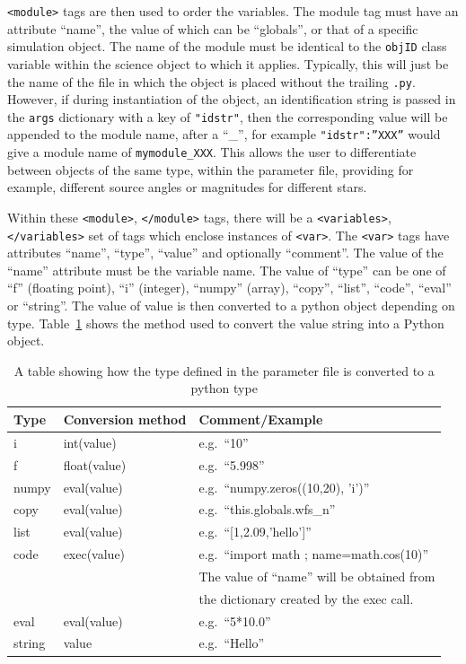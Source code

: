 \documentclass{article}
\begin{document}
\texttt{<module>} tags are then used to order the variables.  The
module tag must have an attribute ``name'', the value of which can be
``globals'', or that of a specific simulation object.  The name of the
module must be identical to the \texttt{objID} class variable within
the science object to which it applies.  Typically, this will just be
the name of the file in which the object is placed without the
trailing \texttt{.py}.  However, if during instantiation of the
object, an identification string is passed in the \texttt{args}
dictionary with a key of \texttt{"idstr"}, then the corresponding
value will be appended to the module name, after a ``\_'', for example
\texttt{"idstr":''XXX''} would give a module name of
\texttt{mymodule\_XXX}.  This allows the user to differentiate between
objects of the same type, within the parameter file, providing for
example, different source angles or magnitudes for different stars.

Within these \texttt{<module>}, \texttt{</module>} tags, there will be
a \texttt{<variables>}, \texttt{</variables>} set of tags which
enclose instances of \texttt{<var>}.  The \texttt{<var>} tags have
attributes ``name'', ``type'', ``value'' and optionally ``comment''.
The value of the ``name'' attribute must be the variable name.  The
value of ``type'' can be one of ``f'' (floating point), ``i''
(integer), ``numpy'' (array), ``copy'', ``list'', ``code'', ``eval''
or ``string''.  The value of value is then converted to a python
object depending on type.  Table~\ref{table:conversiontable} shows the
method used to convert the value string into a Python object.

\begin{table}
\begin{tabular}{|l|l|l|}\hline
Type & Conversion method & Comment/Example\\ \hline
i & int(value) & e.g.\ ``10''\\ \hline
f & float(value) & e.g.\ ``5.998''\\ \hline
numpy & eval(value) & e.g.\ ``numpy.zeros((10,20), 'i')''\\ \hline
copy & eval(value) & e.g.\ ``this.globals.wfs\_n''\\ \hline
list & eval(value) & e.g.\ ``[1,2.09,'hello']''\\ \hline
code & exec(value) & e.g.\ ``import math ; name=math.cos(10)''\\
&& The value of ``name'' will be obtained from\\
&& the dictionary created by the exec call.\\ \hline
eval & eval(value) & e.g.\ ``5*10.0'' \\ \hline
string & value & e.g.\ ``Hello''\\ \hline
\end{tabular}
\caption{A table showing how the type defined in the parameter file is
  converted to a python type}
\label{table:conversiontable}
\end{table}
\end{document}
